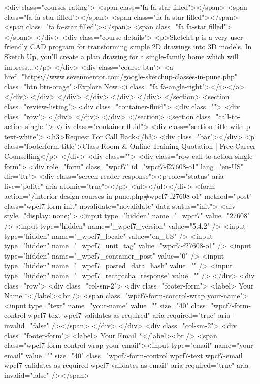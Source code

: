 {<div class="courses-rating">
<span class="fa fa-star filled"></span>
<span class="fa fa-star filled"></span>
<span class="fa fa-star filled"></span>
<span class="fa fa-star filled"></span>
<span class="fa fa-star filled"></span>
</div>
<div class="course-details">
<p>SketchUp is a very user-friendly CAD program for transforming simple 2D drawings into 3D models. In Sketch Up, you’ll create a plan drawing for a single-family home which will impress...</p>
</div>
<div class="course-btn">
<a href="https://www.sevenmentor.com/google-sketchup-classes-in-pune.php" class="btn btn-orage">Explore Now <i class="fa fa-angle-right"></i></a>
</div>
</div>
</div>
</div>
</div> 
</div> 
</section>
<section class="review-listing">
<div class="container-fluid">
<div class="">
<div class="row">
</div>
</div>
</div>
</section>
<section class="call-to-action-single ">
<div class="container-fluid">
<div class="section-title with-p text-white">
<h3>Request For Call Back</h3>
<div class="bar"></div>
<p class="footerform-title">Class Room & Online Training Quotation | Free Career Counselling</p>
</div>
<div class="">
<div class="row call-to-action-single-form">
<div role="form" class="wpcf7" id="wpcf7-f27608-o1" lang="en-US" dir="ltr">
<div class="screen-reader-response"><p role="status" aria-live="polite" aria-atomic="true"></p> <ul></ul></div>
<form action="/interior-design-courses-in-pune.php#wpcf7-f27608-o1" method="post" class="wpcf7-form init" novalidate="novalidate" data-status="init">
<div style="display: none;">
<input type="hidden" name="_wpcf7" value="27608" />
<input type="hidden" name="_wpcf7_version" value="5.4.2" />
<input type="hidden" name="_wpcf7_locale" value="en_US" />
<input type="hidden" name="_wpcf7_unit_tag" value="wpcf7-f27608-o1" />
<input type="hidden" name="_wpcf7_container_post" value="0" />
<input type="hidden" name="_wpcf7_posted_data_hash" value="" />
<input type="hidden" name="_wpcf7_recaptcha_response" value="" />
</div>
<div class="row">
<div class="col-sm-2">
<div class="footer-form">
<label> Your Name *</label><br />
<span class="wpcf7-form-control-wrap your-name"><input type="text" name="your-name" value="" size="40" class="wpcf7-form-control wpcf7-text wpcf7-validates-as-required" aria-required="true" aria-invalid="false" /></span>
</div>
</div>
<div class="col-sm-2">
<div class="footer-form">
<label> Your Email *</label><br />
<span class="wpcf7-form-control-wrap your-email"><input type="email" name="your-email" value="" size="40" class="wpcf7-form-control wpcf7-text wpcf7-email wpcf7-validates-as-required wpcf7-validates-as-email" aria-required="true" aria-invalid="false" /></span>
}
